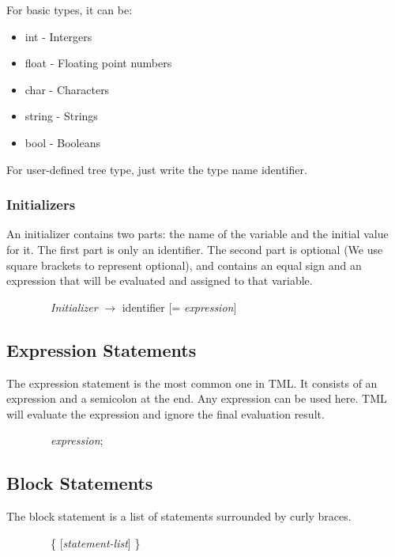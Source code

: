 \documentclass[12pt,psfig,a4]{article}
\begin{document}
For basic types, it can be:
\begin{itemize}
\setlength{\itemsep}{0pt}
\setlength{\parskip}{0pt}
\item int - Intergers
\item float - Floating point numbers
\item char - Characters
\item string - Strings
\item bool - Booleans
\end{itemize}

For user-defined tree type, just write the type name identifier.

\subsubsection{Initializers}
An initializer contains two parts: the name of the variable and the initial value for it. The first part is only an identifier. The second part is optional (We use square brackets to represent optional), and contains an equal sign and an expression that will be evaluated and assigned to that variable.

\begin{code}
\begin{tabbing}
~~~~~~~~\textsl{Initializer} $\rightarrow$ identifier [= \textsl{expression}]
\end{tabbing}
\end{code}

\subsection{Expression Statements}
The expression statement is the most common one in TML. It consists of an expression and a semicolon at the end. Any expression can be used here. TML will evaluate the expression and ignore the final evaluation result.

\begin{code}
\begin{tabbing}
~~~~~~~~\textsl{expression};
\end{tabbing}
\end{code}

\subsection{Block Statements}
The block statement is a list of statements surrounded by curly braces.

\begin{code}
\begin{tabbing}
~~~~~~~~\{ [\textsl{statement-list}]
\}
\end{tabbing}
\end{code}
\end{document}
